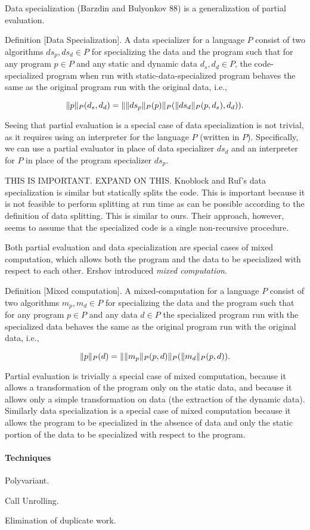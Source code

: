 


Data specialization (Barzdin and Bulyonkov 88) is a generalization of
partial evaluation.

Definition [Data Specialization].  A data specializer for a language
$P$ consist of two algorithms $ds_p, ds_d \in P$ for specializing the
data and the program such that for any program $p \in P$ and any
static and dynamic data $d_s, d_d \in P$, the code-specialized program
when run with static-data-specialized program behaves the same as the
original program run with the original data, i.e.,

\[
\drun{P}{p} (d_s, d_d) = \drun{P}{\drun{P}{ds_p} (p)} (\drun{P}{ds_d}
(p,d_s), d_d)).
\]

Seeing that partial evaluation is a special case of data
specialization is not trivial, as it requires using an interpreter for
the language $P$ (written in $P$).  Specifically, we can use a partial
evaluator in place of data specializer $ds_d$ and an  interpreter for $P$ in
place of the program specializer $ds_p$. 




THIS IS IMPORTANT. EXPAND ON THIS.  Knoblock and Ruf's data
specialization is similar but statically splits the code. This is
important because it is not feasible to perform splitting at run time
as can be possible according to the definition of data splitting. This
is similar to ours.  Their approach, however, seems to assume that the
specialized code is a single non-recursive procedure.


Both partial evaluation and data specialization are special cases of
mixed computation, which allows both the program and the data to be
specialized with respect to each other.  Ershov introduced {\em mixed
  computation}. 


Definition [Mixed computation]. A mixed-computation for a language $P$
consist of two algorithms $m_p, m_d \in P$ for specializing the data
and the program such that for any program $p \in P$ and any data $d
\in P$ the specialized program run with the specialized data behaves
the same as the original program run with the original data, i.e.,

\[
\drun{P}{p} (d) = \drun{P}{\drun{P}{m_p} (p,d)} (\drun{P}{m_d} (p,d)).
\]


Partial evaluation is trivially a special case of mixed computation,
because it allows a transformation of the program only on the static
data, and because it allows only a simple transformation on data (the
extraction of the dynamic data).  Similarly data specialization is a
special case of mixed computation because it allows the program to be
specialized in the absence of data and only the static portion of the
data to be specialized with respect to the program.


\paragraph{Techniques}

Polyvariant.

Call Unrolling.

Elimination of duplicate work.



